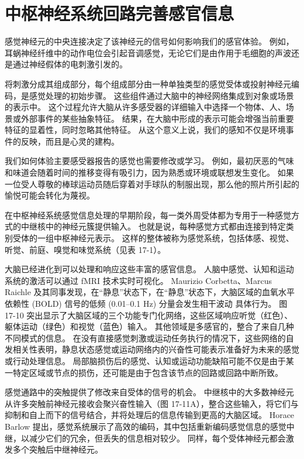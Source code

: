 \section{中枢神经系统回路完善感官信息}

感觉神经元的中央连接决定了该神经元的信号如何影响我们的感官体验。 例如，耳蜗神经纤维中的动作电位会引起音调感觉，无论它们是由作用于毛细胞的声波还是通过神经假体的电刺激引发的。

将刺激分成其组成部分，每个组成部分由一种单独类型的感觉受体或投射神经元编码，是感觉处理的初始步骤。 这些组件通过大脑中的神经网络集成到对象或场景的表示中。 这个过程允许大脑从许多感受器的详细输入中选择一个物体、人、场景或外部事件的某些抽象特征。 结果，在大脑中形成的表示可能会增强当前重要特征的显着性，同时忽略其他特征。 从这个意义上说，我们的感知不仅是环境事件的反映，而且是心灵的建构。

我们如何体验主要感受器报告的感觉也需要修改或学习。 例如，最初厌恶的气味和味道会随着时间的推移变得有吸引力，因为熟悉或环境或联想发生变化。 如果一位受人尊敬的棒球运动员随后穿着对手球队的制服出现，那么他的照片所引起的愉悦可能会转化为蔑视。

在中枢神经系统感觉信息处理的早期阶段，每一类外周受体都为专用于一种感觉方式的中继核中的神经元簇提供输入。 也就是说，每种感觉方式都由连接到特定类别受体的一组中枢神经元表示。 这样的整体被称为感觉系统，包括体感、视觉、听觉、前庭、嗅觉和味觉系统（见表 17-1）。

大脑已经进化到可以处理和响应这些丰富的感官信息。 人脑中感觉、认知和运动系统的激活可以通过 fMRI 技术实时可视化。 Maurizio Corbetta、Marcus Raichle 及其同事发现，在“静息”状态下，在“静息”状态下，大脑区域的血氧水平依赖性 (BOLD) 信号的低频 (0.01–0.1 Hz) 分量会发生相干波动 具体行为。 图 17-10 突出显示了大脑区域的三个功能专门化网络，这些区域响应听觉（红色）、躯体运动（绿色）和视觉（蓝色）输入。 其他领域是多感官的，整合了来自几种不同模式的信息。 在没有直接感觉刺激或运动任务执行的情况下，这些网络的自发相关性表明，静息状态感觉或运动网络内的兴奋性可能表示准备好为未来的感觉或行动处理信息。 局部脑损伤后的感觉、认知或运动功能缺陷可能不仅是由于某一特定区域或节点的损伤，还可能是由于包含该节点的回路或回路中断所致。

感觉通路中的突触提供了修改来自受体的信号的机会。 中继核中的大多数神经元从许多突触前神经元接收会聚兴奋性输入（图 17-11A），整合这些输入，将它们与抑制和自上而下的信号结合，并将处理后的信息传输到更高的大脑区域。 Horace Barlow 提出，感觉系统展示了高效的编码，其中包括重新编码感觉信息的感觉中继，以减少它们的冗余，但丢失的信息相对较少。 同样，每个受体神经元都会激发多个突触后中继神经元。

